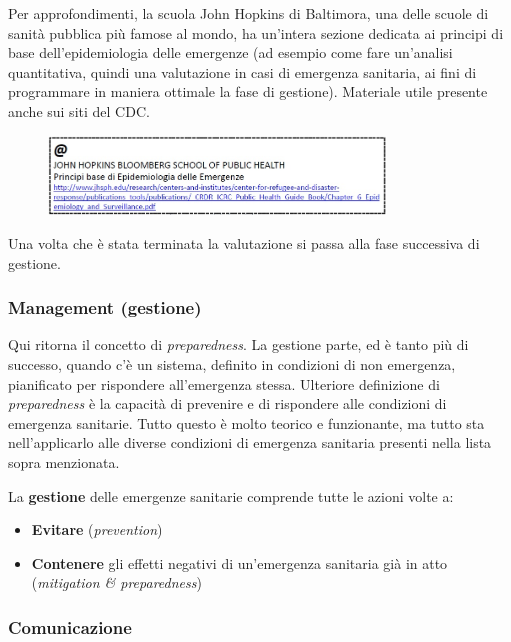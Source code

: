 Per approfondimenti, la scuola John Hopkins di Baltimora, una delle
scuole di sanità pubblica più famose al mondo, ha un'intera sezione
dedicata ai principi di base dell'epidemiologia delle emergenze (ad
esempio come fare un'analisi quantitativa, quindi una valutazione in
casi di emergenza sanitaria, ai fini di programmare in maniera ottimale
la fase di gestione). Materiale utile presente anche sui siti del CDC.

\begin{figure}[!ht]
\centering
	\includegraphics[width=0.8\textwidth]{26/image3.jpeg}
	\end{figure}

Una volta che è stata terminata la valutazione si passa alla fase
successiva di gestione.

\subsubsection{Management (gestione)}

Qui ritorna il concetto di \emph{preparedness}. La gestione parte, ed è
tanto più di successo, quando c'è un sistema, definito in condizioni di
non emergenza, pianificato per rispondere all'emergenza stessa.
Ulteriore definizione di \emph{preparedness} è la capacità di prevenire
e di rispondere alle condizioni di emergenza sanitarie. Tutto questo è
molto teorico e funzionante, ma tutto sta nell'applicarlo alle diverse
condizioni di emergenza sanitaria presenti nella lista sopra menzionata.

La \textbf{gestione} delle emergenze sanitarie comprende tutte le azioni
volte a:

\begin{itemize}
\item
  \textbf{Evitare} (\emph{prevention})
\item
  \textbf{Contenere} gli effetti negativi di un'emergenza sanitaria già
  in atto (\emph{mitigation \& preparedness})
\end{itemize}

\subsubsection{Comunicazione}

